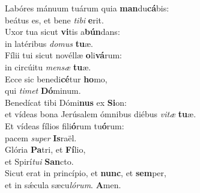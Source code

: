 \evenverse Labóres mánuum tuárum quia \textbf{man}du\textbf{cá}bis:~\*\\
\evenverse beátus es, et bene \textit{ti}\textit{bi} \textbf{e}rit.\\
\oddverse Uxor tua sicut \textbf{vi}tis a\textbf{bún}dans:~\*\\
\oddverse in latéribus \textit{do}\textit{mus} \textbf{tu}æ.\\
\evenverse Fílii tui sicut novéllæ \textbf{o}li\textbf{vá}rum:~\*\\
\evenverse in circúitu \textit{men}\textit{sæ} \textbf{tu}æ.\\
\oddverse Ecce sic benedi\textbf{cé}tur \textbf{ho}mo,~\*\\
\oddverse qui \textit{ti}\textit{met} \textbf{Dó}minum.\\
\evenverse Benedícat tibi Dómi\textbf{nus} ex \textbf{Si}on:~\*\\
\evenverse et vídeas bona Jerúsalem ómnibus diébus \textit{vi}\textit{tæ} \textbf{tu}æ.\\
\oddverse Et vídeas fílios fili\textbf{ó}rum tu\textbf{ó}rum:~\*\\
\oddverse pacem \textit{su}\textit{per} \textbf{Is}raël.\\
\evenverse Glória \textbf{Pa}tri, et \textbf{Fí}lio,~\*\\
\evenverse et Spirí\textit{tu}\textit{i} \textbf{San}cto.\\
\oddverse Sicut erat in princípio, et \textbf{nunc}, et \textbf{sem}per,~\*\\
\oddverse et in sǽcula sæcu\textit{ló}\textit{rum}. \textbf{A}men.\\
